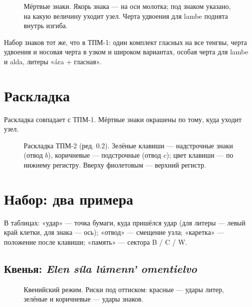 \begin{figure}[h]
\centering
\setlength\tgem{24mm}
\begin{tikzpicture}[x=\tgu,y=\tgu]

\end{tikzpicture}
\caption{Мёртвые знаки. Якорь знака — на оси молотка; под знаком указано, на какую величину уходит узел. Черта удвоения для lambe поднята внутрь изгиба.}
\end{figure}

Набор знаков тот же, что в ТПМ-1: один комплект гласных на все тенгвы, черта удвоения и носовая черта в узком и широком вариантах, особая черта для lambe и alda, литеры «ára + гласная».

\section{Раскладка}

Раскладка совпадает с ТПМ-1. Мёртвые знаки окрашены по тому, куда уходит узел.

\begin{figure}[h]
\centering
\begin{tikzpicture}[x=1mm,y=1mm]

\end{tikzpicture}
\caption{Раскладка ТПМ-2 (ред. 0.2). Зелёные клавиши — надстрочные знаки (отвод $b$), коричневые — подстрочные (отвод $c$); цвет клавиши — по нижнему регистру. Вверху фиолетовым — верхний регистр.}
\label{fig:kbd}
\end{figure}

\section{Набор: два примера}
\label{sec:examples}

В таблицах: «удар» — точка бумаги, куда пришёлся удар (для литеры — левый край клетки, для знака — ось); «отвод» — смещение узла; «каретка» — положение после клавиши; «память» — сектора B / C / W.

\subsection{Квенья: \emph{Elen síla lúmenn' omentielvo}}

\begin{figure}[h]
\centering
\setlength\tgem{12.5mm}
\begin{tikzpicture}[x=\tgu,y=\tgu]

\end{tikzpicture}
\caption{Квенийский режим. Риски под оттиском: красные — удары литер, зелёные и коричневые — удары знаков.}
\end{figure}

